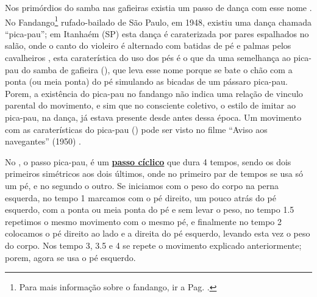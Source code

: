 Nos primórdios do samba nas gafieiras existia um passo de dança com esse nome \cite[pp. 142]{perna2002samba}.
No Fandango\footnote{Para mais informação sobre o fandango, ir a Pag. \pageref{fig:fandango}.} 
rufado-bailado de São Paulo, em 1948, existiu uma dança chamada ``pica-pau'';
em Itanhaém (SP) esta dança é caraterizada por pares espalhados no salão,
onde o canto do violeiro é alternado com batidas de pé e palmas pelos 
cavalheiros \cite[pp. 607-608]{marcondes1977enciclopediav2} \cite[pp. 49]{fandangoSP},
esta caraterística do uso dos pés é o que da uma semelhança ao pica-pau do samba de gafieira (\AnoLivro),
que leva esse nome porque se bate o chão com a ponta (ou meia ponta) do pé simulando as bicadas de um pássaro pica-pau.
Porem, a existência do pica-pau no fandango não indica uma relação de vinculo parental do movimento,
e sim que no consciente coletivo, o estilo de imitar ao pica-pau, na dança,
já estava presente desde antes dessa época.
Um movimento com as caraterísticas do pica-pau (\AnoLivro) pode ser visto 
no filme ``Aviso aos navegantes'' (1950) \cite[min. 40:35]{AtlantidaDance}.

No \AnoLivro, o passo pica-pau, é um \hyperref[def:PassoCiclico]{\textbf{passo cíclico}} que dura 4 tempos, 
sendo os dois primeiros simétricos aos dois últimos, 
onde no primeiro par de tempos se usa só um pé,
e no segundo o outro.
Se iniciamos com o peso do corpo na perna esquerda, 
no tempo 1 marcamos com o pé direito, um pouco atrás do pé esquerdo, 
com a ponta ou meia ponta do pé e sem levar o peso,
no tempo 1.5 repetimos o mesmo movimento com o mesmo pé, e finalmente
no tempo 2 colocamos o pé direito ao lado e a direita do pé esquerdo, 
levando esta vez o peso do corpo. 
Nos tempo 3, 3.5 e 4 se repete o movimento explicado anteriormente; porem,
agora se usa o pé esquerdo.
  
